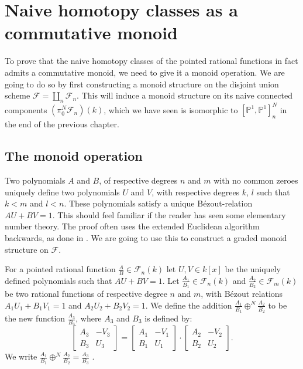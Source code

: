 \chapter{Naive homotopy classes as a commutative monoid}
%
To prove that the naive homotopy classes of the pointed rational functions in fact admits a commutative monoid, we need to give it a monoid operation. We are going to do so by first constructing a monoid structure on the disjoint union scheme \(\mathcal{F}=\displaystyle \coprod_n \mathcal{F}_n\). This will induce a monoid structure on its naive connected components \((\pi_0^N\mathcal{F}_n)(k)\), which we have seen is isomorphic to \([\mathbb{P}^1,\mathbb{P}^1]^N_n\) in the end of the previous chapter. 

%
%

\section{The monoid operation}
%
Two polynomials \(A\) and \(B\), of respective degrees \(n\) and \(m\) with no common zeroes uniquely define two polynomials \(U\) and \(V\), with respective degrees \(k\), \( l\) such that \(k < m\) and \(l < n\). These polynomials satisfy a unique Bézout-relation \(AU+BV=1\). This should feel familiar if the reader has seen some elementary number theory. The proof often uses the extended Euclidean algorithm backwards, as done in \cite[Thm 3.6.1]{hsu}. We are going to use this to construct a graded monoid structure on \(\mathcal{F}\). 
%
\begin{definition}\label{def:monoid operation}
For a pointed rational function \(\frac{A}{B}\in \mathcal{F}_n(k)\) let  \(U, V \in k[x]\) be the uniquely defined polynomials such that \(AU+BV=1\). Let  \(\frac{A_1}{B_1}\in \mathcal{F}_n(k)\) and \(\frac{A_2}{B_2}\in \mathcal{F}_m(k)\) be two rational functions of respective degree \(n\) and \(m\), with Bézout relations \(A_1 U_1 + B_1 V_1 = 1\) and \(A_2 U_2 + B_2 V_2 = 1\). We define the addition \(\frac{A_1}{B_1}\oplus^N \frac{A_2}{B_2}\) to be the new function \(\frac{A_3}{B_3}\), where \(A_3\) and \(B_3\) is defined by:
\begin{equation*}
%
\begin{bmatrix}
    A_3 & -V_3 \\
    B_3 & U_3 
\end{bmatrix} = 
%
\begin{bmatrix}
    A_1 & -V_1 \\
    B_1 & U_1 
\end{bmatrix}\cdot
%
\begin{bmatrix}
    A_2 & -V_2 \\
    B_2 & U_2 
\end{bmatrix}.
%
\end{equation*}
%
We write \(\frac{A_1}{B_1}\oplus^N\frac{A_2}{B_2} = \frac{A_3}{B_3}\) . \\
%
\end{definition}
